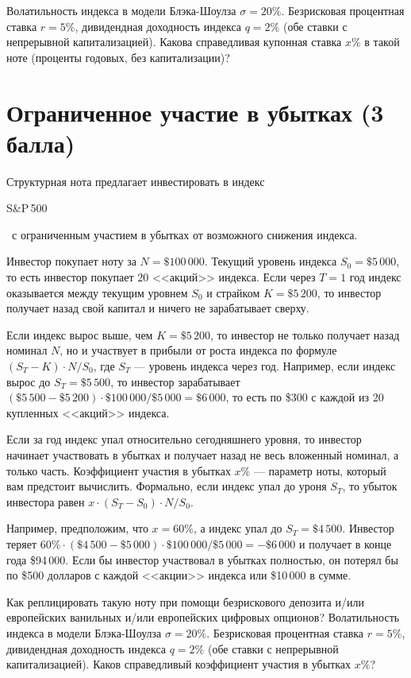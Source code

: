 \documentclass[a4paper,14pt]{extarticle}
\newcommand{\en}[1]{\begin{otherlanguage}{english}#1\end{otherlanguage}}
\begin{document}
Волатильность индекса в модели Блэка-Шоулза $\sigma=20\%$. Безрисковая процентная ставка $r=5\%$, дивидендная  доходность индекса $q=2\%$ (обе ставки с непрерывной капитализацией). Какова справедливая купонная ставка $x\%$ в такой ноте (проценты годовых, без капитализации)?

\section{Ограниченное участие в убытках (3 балла)}

Структурная нота предлагает инвестировать в индекс \en{S\&P\,500}\ с ограниченным участием в убытках от возможного снижения индекса.

Инвестор покупает ноту за $N=\$100\,000$. Текущий уровень индекса $S_0=\$5\,000$, то есть инвестор покупает 20 <<акций>> индекса. Если через $T=1$ год индекс оказывается между текущим уровнем $S_0$ и страйком $K=\$5\,200$, то инвестор получает назад свой капитал и ничего не зарабатывает сверху.

Если индекс вырос выше, чем $K=\$5\,200$, то инвестор не только получает назад номинал $N$, но и участвует в прибыли от роста индекса по формуле $(S_T - K) \cdot N / S_0$, где $S_T$ --- уровень индекса через год. Например, если индекс вырос до $S_T = \$5\,500$, то инвестор зарабатывает $(\$5\,500-\$5\,200)\cdot\$100\,000 / \$5\,000 = \$6\,000$, то есть по \$300 с каждой из 20 купленных <<акций>> индекса. 

Если за год индекс упал относительно сегодняшнего уровня, то инвестор начинает участвовать в убытках и получает назад не весь вложенный номинал, а только часть. Коэффициент участия в убытках $x\%$ --- параметр ноты, который вам предстоит вычислить. Формально, если индекс упал до уроня $S_T$, то убыток инвестора равен $x \cdot (S_T - S_0) \cdot N/S_0$. 

Например, предположим, что $x=60\%$, а индекс упал до $S_T=\$4\,500$. Инвестор теряет $60\% \cdot (\$4\,500 - \$5\,000) \cdot \$100\,000/\$5\,000 = -\$6\,000$ и получает в конце года \$94\,000. Если бы инвестор участвовал в убытках полностью, он потерял бы по \$500 долларов с каждой <<акции>> индекса или \$10\,000 в сумме.

Как реплицировать такую ноту при помощи безрискового депозита и/или европейских ванильных и/или европейских цифровых опционов? Волатильность индекса в модели Блэка-Шоулза $\sigma=20\%$. Безрисковая процентная ставка $r=5\%$, дивидендная  доходность индекса $q=2\%$ (обе ставки с непрерывной капитализацией). Каков справедливый коэффициент участия в убытках $x\%$?
\end{document}
